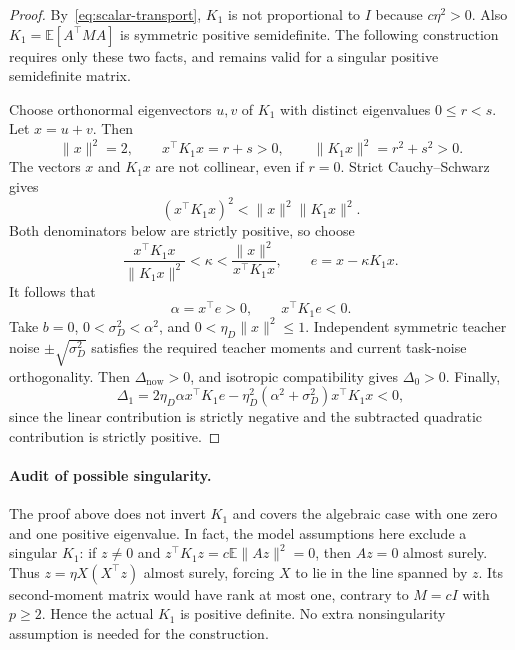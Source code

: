 \begin{proof}
By~\eqref{eq:scalar-transport}, $K_1$ is not proportional to $I$ because
$c\eta^2>0$. Also $K_1=\mathbb E[A^\top MA]$ is symmetric positive
semidefinite. The following construction requires only these two facts,
and remains valid for a singular positive semidefinite matrix.

Choose orthonormal eigenvectors $u,v$ of $K_1$ with distinct eigenvalues
$0\leq r<s$. Let $x=u+v$. Then
\begin{equation}
    \|x\|^2=2,\qquad x^\top K_1x=r+s>0,\qquad
    \|K_1x\|^2=r^2+s^2>0.
\end{equation}
The vectors $x$ and $K_1x$ are not collinear, even if $r=0$. Strict
Cauchy--Schwarz gives
\begin{equation}
    (x^\top K_1x)^2<\|x\|^2\|K_1x\|^2.
\end{equation}
Both denominators below are strictly positive, so choose
\begin{equation}
    \frac{x^\top K_1x}{\|K_1x\|^2}<\kappa
    <\frac{\|x\|^2}{x^\top K_1x},\qquad e=x-\kappa K_1x.
\end{equation}
It follows that
\begin{equation}
    \alpha=x^\top e>0,\qquad x^\top K_1e<0.
\end{equation}
Take $b=0$, $0<\sigma_D^2<\alpha^2$, and
$0<\eta_D\|x\|^2\leq1$. Independent symmetric teacher noise
$\pm\sqrt{\sigma_D^2}$ satisfies the required teacher moments and
current task-noise orthogonality. Then $\Delta_{\mathrm{now}}>0$, and
isotropic compatibility gives $\Delta_0>0$. Finally,
\begin{equation}
    \Delta_1=2\eta_D\alpha x^\top K_1e
      -\eta_D^2(\alpha^2+\sigma_D^2)x^\top K_1x<0,
\end{equation}
since the linear contribution is strictly negative and the subtracted
quadratic contribution is strictly positive.
\end{proof}

\paragraph{Audit of possible singularity.}
The proof above does not invert $K_1$ and covers the algebraic case with
one zero and one positive eigenvalue. In fact, the model assumptions
here exclude a singular $K_1$: if $z\ne0$ and
$z^\top K_1z=c\mathbb E\|Az\|^2=0$, then $Az=0$ almost surely.
Thus $z=\eta X(X^\top z)$ almost surely, forcing $X$ to lie in the
line spanned by $z$. Its second-moment matrix would have rank at most one,
contrary to $M=cI$ with $p\geq2$. Hence the actual $K_1$ is positive
definite. No extra nonsingularity assumption is needed for the construction.

